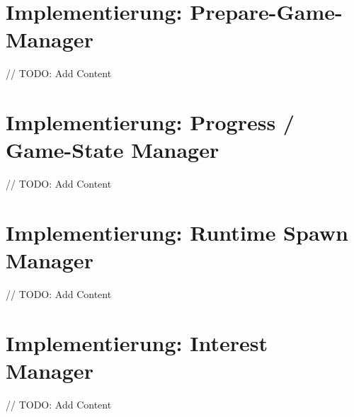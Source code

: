 \section{Implementierung: Prepare-Game-Manager}

// TODO: Add Content

\section{Implementierung: Progress / Game-State Manager}

// TODO: Add Content

\section{Implementierung: Runtime Spawn Manager}

// TODO: Add Content

\section{Implementierung: Interest Manager}

// TODO: Add Content










